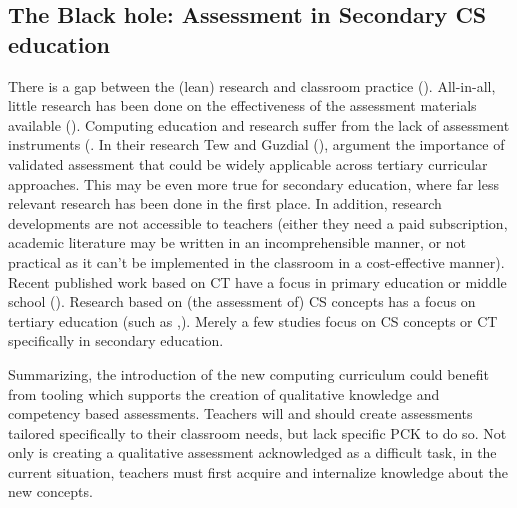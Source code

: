 \subsection{The Black hole: Assessment in Secondary CS education}
There is a gap between the (lean) research and classroom practice (\cite{Yadav2015}). All-in-all, little research has been done on the effectiveness of the assessment materials available (\cite{Yadav2016}). Computing education and research suffer from the lack of assessment instruments (\cite{voogt2017effecten}. In their research Tew and Guzdial (\cite{2010TewGuzdial}), argument the importance of validated assessment that could be widely applicable across tertiary curricular approaches. This may be even more true for secondary education, where far less relevant research has been done in the first place. In addition, research developments are not accessible to teachers (either they need a paid subscription, academic literature may be written in an incomprehensible manner, or not practical as it can’t be implemented in the classroom in a cost-effective manner). Recent published work based on CT have a focus in primary education or middle school (\cite{LyeKoh2014}). Research based on (the assessment of) CS concepts has a focus on tertiary education (such as \cite{McCracken2001},\cite{2010TewGuzdial}). Merely a few studies focus on CS concepts or CT specifically in secondary education.




Summarizing, the introduction of the new computing curriculum could benefit from tooling which supports the creation of qualitative knowledge and competency based assessments. Teachers will and should create assessments tailored specifically to their classroom needs, but lack specific PCK to do so. Not only is creating a qualitative assessment acknowledged as a difficult task, in the current situation, teachers must first acquire and internalize knowledge about the new concepts.
